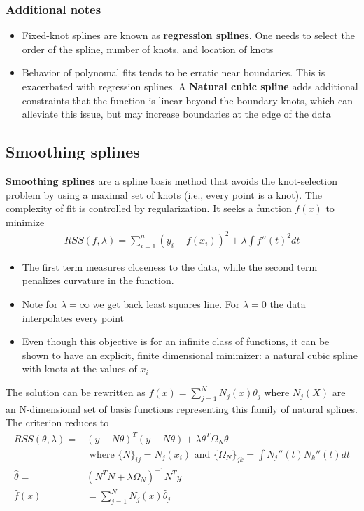 \documentclass{article}
\begin{document}
\subsubsection{Additional notes}
\begin{itemize}
  \item Fixed-knot splines are known as \textbf{regression splines}. One needs to select the order of the spline, number of knots, and location of knots
  \item Behavior of polynomal fits tends to be erratic near boundaries. This is exacerbated with regression splines. A \textbf{Natural cubic spline} adds additional constraints that the function is linear beyond the boundary knots, which can alleviate this issue, but may increase boundaries at the edge of the data
\end{itemize}

\subsection{Smoothing splines}
\textbf{Smoothing splines} are a spline basis method that avoids the knot-selection problem by using a maximal set of knots (i.e., every point is a knot). The complexity of fit is controlled by regularization. It seeks a function $f(x)$ to minimize 
\begin{align*}
  RSS(f, \lambda) = \sum_{i=1}^n(y_i - f(x_i))^2 + \lambda \int f''(t)^2dt
\end{align*}
\begin{itemize}
  \item The first term measures closeness to the data, while the second term penalizes curvature in the function. 
  \item Note for $\lambda = \infty$ we get back least squares line. For $\lambda = 0$ the data interpolates every point
  \item Even though this objective is for an infinite class of functions, it can be shown to have an explicit, finite dimensional minimizer: a natural cubic spline with knots at the values of $x_i$
\end{itemize}
The solution can be rewritten as $f(x) = \sum_{j=1}^NN_j(x)\theta_j$ where $N_j(X)$ are an N-dimensional set of basis functions representing this family of natural splines. The criterion reduces to
\begin{align*}
  RSS(\theta, \lambda) =& (y - N\theta)^T(y-N\theta) + \lambda \theta^T\Omega_N\theta\\
  & \textrm{ where } \{N\}_{ij} = N_j(x_i) \textrm{ and } \{\Omega_N\}_{jk} = \int N_j''(t)N_k''(t)dt\\
  \hat{\theta} =& (N^TN + \lambda\Omega_N)^{-1}N^Ty\\
  \hat{f}(x) &= \sum_{j=1}^NN_j(x)\hat{\theta}_j
\end{align*}
\end{document}
